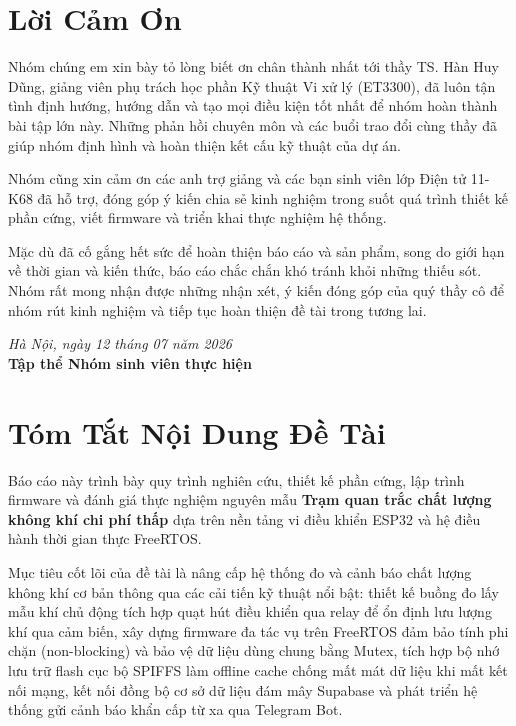 \documentclass[12pt,a4paper,oneside]{report}
\begin{document}

\chapter*{Lời Cảm Ơn}
Nhóm chúng em xin bày tỏ lòng biết ơn chân thành nhất tới thầy TS. Hàn Huy Dũng, giảng viên phụ trách học phần Kỹ thuật Vi xử lý (ET3300), đã luôn tận tình định hướng, hướng dẫn và tạo mọi điều kiện tốt nhất để nhóm hoàn thành bài tập lớn này. Những phản hồi chuyên môn và các buổi trao đổi cùng thầy đã giúp nhóm định hình và hoàn thiện kết cấu kỹ thuật của dự án.

Nhóm cũng xin cảm ơn các anh trợ giảng và các bạn sinh viên lớp Điện tử 11-K68 đã hỗ trợ, đóng góp ý kiến chia sẻ kinh nghiệm trong suốt quá trình thiết kế phần cứng, viết firmware và triển khai thực nghiệm hệ thống.

Mặc dù đã cố gắng hết sức để hoàn thiện báo cáo và sản phẩm, song do giới hạn về thời gian và kiến thức, báo cáo chắc chắn khó tránh khỏi những thiếu sót. Nhóm rất mong nhận được những nhận xét, ý kiến đóng góp của quý thầy cô để nhóm rút kinh nghiệm và tiếp tục hoàn thiện đề tài trong tương lai.

\vspace{1.5cm}
\begin{flushright}
    \textit{Hà Nội, ngày 12 tháng 07 năm 2026} \\
    \textbf{Tập thể Nhóm sinh viên thực hiện}
\end{flushright}

\chapter*{Tóm Tắt Nội Dung Đề Tài}
Báo cáo này trình bày quy trình nghiên cứu, thiết kế phần cứng, lập trình firmware và đánh giá thực nghiệm nguyên mẫu \textbf{Trạm quan trắc chất lượng không khí chi phí thấp} dựa trên nền tảng vi điều khiển ESP32 và hệ điều hành thời gian thực FreeRTOS. 

Mục tiêu cốt lõi của đề tài là nâng cấp hệ thống đo và cảnh báo chất lượng không khí cơ bản thông qua các cải tiến kỹ thuật nổi bật: thiết kế buồng đo lấy mẫu khí chủ động tích hợp quạt hút điều khiển qua relay để ổn định lưu lượng khí qua cảm biến, xây dựng firmware đa tác vụ trên FreeRTOS đảm bảo tính phi chặn (non-blocking) và bảo vệ dữ liệu dùng chung bằng Mutex, tích hợp bộ nhớ lưu trữ flash cục bộ SPIFFS làm offline cache chống mất mát dữ liệu khi mất kết nối mạng, kết nối đồng bộ cơ sở dữ liệu đám mây Supabase và phát triển hệ thống gửi cảnh báo khẩn cấp từ xa qua Telegram Bot.
\end{document}
